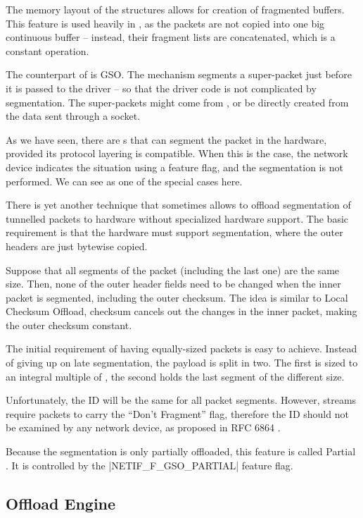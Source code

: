 The memory layout of the \skb{} structures allows for creation of fragmented
buffers. This feature is used heavily in , as the packets are not copied
into one big continuous buffer -- instead, their fragment lists are
concatenated, which is a constant operation.

The counterpart of  is \acrfull{GSO}. The  mechanism segments
a super-packet just before it is passed to the driver -- so that the driver
code is not complicated by segmentation. The super-packets might come from
, or be directly created from the data sent through a socket.

As we have seen, there are s that can segment the packet in the
hardware, provided its protocol layering is compatible. When this is the
case, the network device indicates the situation using a feature flag, and the
segmentation is not performed. We can see  as one of the special cases
here.

There is yet another technique that sometimes allows to offload segmentation
of tunnelled packets to hardware without specialized hardware support. The basic
requirement is that the hardware must support segmentation, where the outer
headers are just bytewise copied.

Suppose that all segments of the packet (including the last one) are the same size. Then,
none of the outer header fields need to be changed when the inner packet is
segmented, including the outer checksum. The idea is similar to Local Checksum
Offload, checksum cancels out the changes in the inner packet, making the outer
checksum constant.

The initial requirement of having equally-sized packets is easy to achieve.
Instead of giving up on late segmentation, the payload is split in two. The
first is sized to an integral multiple of , the second holds the last
segment of the different size.

Unfortunately, the  ID will be the same for all packet segments.
However,  streams require  packets to carry the ``Don't
Fragment'' flag, therefore the ID should not be examined by any network device,
as proposed in RFC 6864 \cite{RFC6864}.

Because the segmentation is only partially offloaded, this feature is called
Partial . It is controlled by the \macro|NETIF_F_GSO_PARTIAL| feature flag.

\subsection{ Offload Engine}

